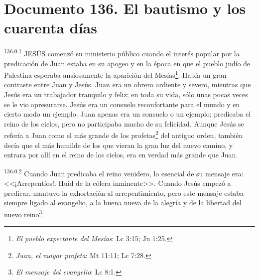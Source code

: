 \chapter{Documento 136. El bautismo y los cuarenta días}
\par 
\textsuperscript{136:0.1} JESÚS comenzó su ministerio público cuando el interés popular por la predicación de Juan estaba en su apogeo y en la época en que el pueblo judío de Palestina esperaba ansiosamente la aparición del Mesías\footnote{\textit{El pueblo expectante del Mesías}: Lc 3:15; Jn 1:25.}. Había un gran contraste entre Juan y Jesús. Juan era un obrero ardiente y severo, mientras que Jesús era un trabajador tranquilo y feliz; en toda su vida, sólo unas pocas veces se le vio apresurarse. Jesús era un consuelo reconfortante para el mundo y en cierto modo un ejemplo. Juan apenas era un consuelo o un ejemplo; predicaba el reino de los cielos, pero no participaba mucho de su felicidad. Aunque Jesús se refería a Juan como el más grande de los profetas\footnote{\textit{Juan, el mayor profeta}: Mt 11:11; Lc 7:28.} del antiguo orden, también decía que el más humilde de los que vieran la gran luz del nuevo camino, y entrara por allí en el reino de los cielos, era en verdad más grande que Juan.

\par 
\textsuperscript{136:0.2} Cuando Juan predicaba el reino venidero, lo esencial de su mensaje era: <<¡Arrepentíos!. Huid de la cólera inminente>>. Cuando Jesús empezó a predicar, mantuvo la exhortación al arrepentimiento, pero este mensaje estaba siempre ligado al evangelio, a la buena nueva de la alegría y de la libertad del nuevo reino\footnote{\textit{El mensaje del evangelio}: Lc 8:1.}.

